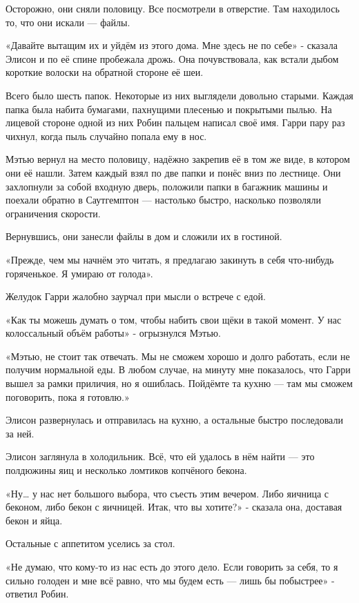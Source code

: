 \documentclass[a5paper, 9pt,
final, openany, twoside=true]{memoir}
\begin{document}
Осторожно, они сняли половицу. Все посмотрели в отверстие. Там находилось то, что они искали — файлы.

«Давайте вытащим их и уйдём из этого дома. Мне здесь не по себе» - сказала Элисон и по её спине пробежала дрожь. Она почувствовала, как встали дыбом короткие волоски на обратной стороне её шеи.

Всего было шесть папок. Некоторые из них выглядели довольно старыми. Каждая папка была набита бумагами, пахнущими плесенью и покрытыми пылью. На лицевой стороне одной из них Робин пальцем написал своё имя. Гарри пару раз чихнул, когда пыль случайно попала ему в нос.

Мэтью вернул на место половицу, надёжно закрепив её в том же виде, в котором они её нашли. Затем каждый взял по две папки и понёс вниз по лестнице. Они захлопнули за собой входную дверь, положили папки в багажник машины и поехали обратно в Саутгемптон — настолько быстро, насколько позволяли ограничения скорости.\bigskip

Вернувшись, они занесли файлы в дом и сложили их в гостиной.

«Прежде, чем мы начнём это читать, я предлагаю закинуть в себя что-нибудь горяченькое. Я умираю от голода».

Желудок Гарри жалобно заурчал при мысли о встрече с едой.

«Как ты можешь думать о том, чтобы набить свои щёки в такой момент. У нас колоссальный объём работы» - огрызнулся Мэтью.

«Мэтью, не стоит так отвечать. Мы не сможем хорошо и долго работать, если не получим нормальной еды. В любом случае, на минуту мне показалось, что Гарри вышел за рамки приличия, но я ошиблась. Пойдёмте та кухню — там мы сможем поговорить, пока я готовлю.»

Элисон развернулась и отправилась на кухню, а остальные быстро последовали за ней.\bigskip

Элисон заглянула в холодильник. Всё, что ей удалось в нём найти — это полдюжины яиц и несколько ломтиков копчёного бекона.

«Ну… у нас нет большого выбора, что съесть этим вечером. Либо яичница с беконом, либо бекон с яичницей. Итак, что вы хотите?» - сказала она, доставая бекон и яйца.

Остальные с аппетитом уселись за стол.

«Не думаю, что кому-то из нас есть до этого дело. Если говорить за себя, то я сильно голоден и мне всё равно, что мы будем есть — лишь бы побыстрее» - ответил Робин.
\end{document}

